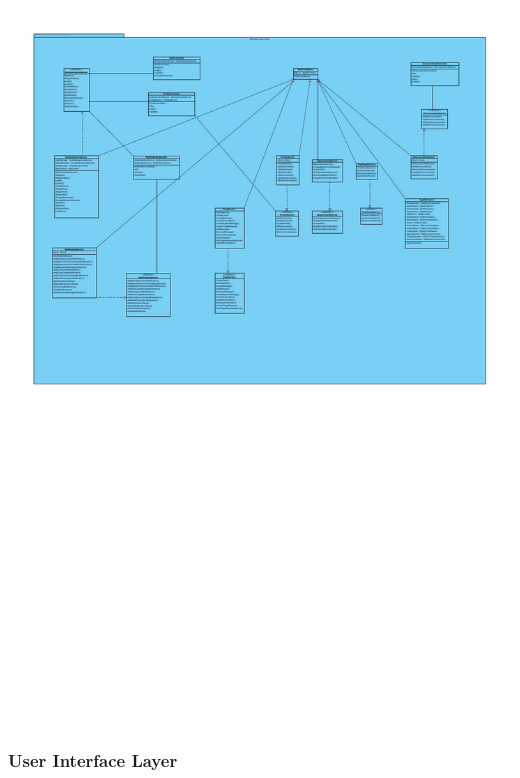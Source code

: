 \documentclass[a4paper, 12pt, titlepage]{article}
\begin{document}
  \includegraphics[width=\linewidth]{businesslogic}

  \subsubsection{User Interface Layer}
\end{document}
